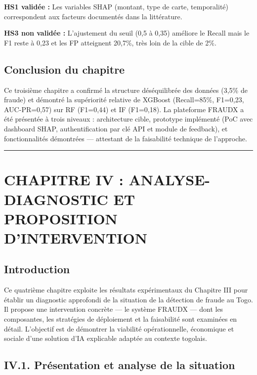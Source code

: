 \documentclass[
  12pt,
]{article}
\begin{document}
\textbf{HS1 validée :} Les variables SHAP (montant, type de carte,
temporalité) correspondent aux facteurs documentés dans la littérature.

\textbf{HS3 non validée :} L’ajustement du seuil (0,5 à 0,35) améliore
le Recall mais le F1 reste à 0,23 et les FP atteignent 20,7\%, très loin
de la cible de 2\%.

\subsection{Conclusion du chapitre}\label{conclusion-du-chapitre-2}

Ce troisième chapitre a confirmé la structure déséquilibrée des données
(3,5\% de fraude) et démontré la supériorité relative de XGBoost
(Recall=85\%, F1=0,23, AUC-PR=0,57) sur RF (F1=0,44) et IF (F1=0,18). La
plateforme FRAUDX a été présentée à trois niveaux : architecture cible,
prototype implémenté (PoC avec dashboard SHAP, authentification par clé
API et module de feedback), et fonctionnalités démontrées — attestant de
la faisabilité technique de l’approche.

\begin{center}\rule{0.5\linewidth}{0.5pt}\end{center}

\section{CHAPITRE IV : ANALYSE-DIAGNOSTIC ET PROPOSITION
D’INTERVENTION}\label{chapitre-iv-analyse-diagnostic-et-proposition-dintervention}

\subsection{Introduction}\label{introduction-3}

Ce quatrième chapitre exploite les résultats expérimentaux du Chapitre
III pour établir un diagnostic approfondi de la situation de la
détection de fraude au Togo. Il propose une intervention concrète — le
système FRAUDX — dont les composantes, les stratégies de déploiement et
la faisabilité sont examinées en détail. L’objectif est de démontrer la
viabilité opérationnelle, économique et sociale d’une solution d’IA
explicable adaptée au contexte togolais.

\subsection{IV.1. Présentation et analyse de la
situation}\label{iv.1.-pruxe9sentation-et-analyse-de-la-situation}
\end{document}
